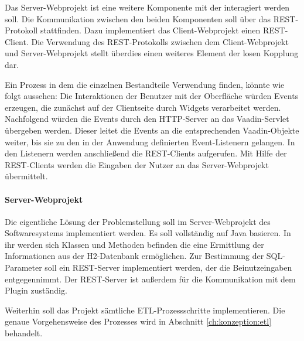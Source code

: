 Das Server-Webprojekt ist eine weitere Komponente mit der interagiert werden soll. Die Kommunikation zwischen den beiden Komponenten soll über das REST-Protokoll stattfinden. Dazu implementiert das Client-Webprojekt einen REST-Client. Die Verwendung des REST-Protokolls zwischen dem Client-Webprojekt und Server-Webprojekt stellt überdies einen weiteres Element der losen Kopplung dar.

Ein Prozess in dem die einzelnen Bestandteile Verwendung finden, könnte wie folgt aussehen: Die Interaktionen der Benutzer mit der Oberfläche würden Events erzeugen, die zunächst auf der Clientseite durch Widgets verarbeitet werden. Nachfolgend würden die Events durch den HTTP-Server an das Vaadin-Servlet übergeben werden. Dieser leitet die Events an die entsprechenden Vaadin-Objekte weiter, bis sie zu den in der Anwendung definierten Event-Listenern gelangen. In den Listenern werden anschließend die REST-Clients aufgerufen. Mit Hilfe der REST-Clients werden die Eingaben der Nutzer an das Server-Webprojekt übermittelt. 

\paragraph{Server-Webprojekt}

Die eigentliche Lösung der Problemstellung soll im Server-Webprojekt des Softwaresystems implementiert werden. Es soll vollständig auf Java basieren. In ihr werden sich Klassen und Methoden befinden die eine Ermittlung der Informationen aus der H2-Datenbank ermöglichen. Zur Bestimmung der SQL-Parameter soll ein REST-Server implementiert werden, der die Beinutzeingaben entgegennimmt. Der REST-Server ist außerdem für die Kommunikation mit dem Plugin zuständig.

Weiterhin soll das Projekt sämtliche ETL-Prozessschritte implementieren. Die genaue Vorgehensweise des Prozesses wird in Abschnitt \ref{ch:konzeption:etl} behandelt. 



